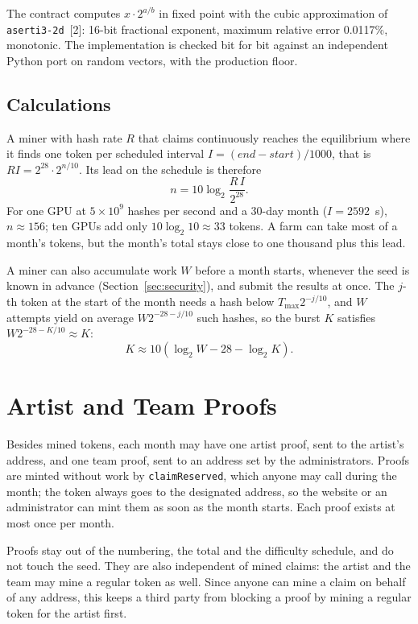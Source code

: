\documentclass[10pt,letterpaper]{article}
\newcommand{\fn}[1]{\texttt{#1}}
\begin{document}
The contract computes $x \cdot 2^{a/b}$ in fixed point with the cubic approximation of
\texttt{aserti3-2d}~[2]: 16-bit fractional exponent, maximum relative error 0.0117\%, monotonic. The
implementation is checked bit for bit against an independent Python port on random vectors, with the production
floor.

\subsection*{Calculations}

A miner with hash rate $R$ that claims continuously reaches the equilibrium where it finds one token per scheduled
interval $I = (\mathit{end} - \mathit{start})/1000$, that is $R I = 2^{28} \cdot 2^{n/10}$. Its lead on the
schedule is therefore
\[
  n = 10 \log_2 \frac{R\, I}{2^{28}} .
\]
For one GPU at $5 \times 10^9$ hashes per second and a 30-day month ($I = 2592$~s), $n \approx 156$; ten GPUs add
only $10 \log_2 10 \approx 33$ tokens. A farm can take most of a month's tokens, but the month's total stays close
to one thousand plus this lead.

A miner can also accumulate work $W$ before a month starts, whenever the seed is known in advance
(Section~\ref{sec:security}), and submit the results at once. The $j$-th token at the start of the month needs a hash
below $T_{\max} 2^{-j/10}$, and $W$ attempts yield on average $W 2^{-28-j/10}$ such hashes, so the burst $K$
satisfies $W 2^{-28-K/10} \approx K$:
\[
  K \approx 10 \left(\log_2 W - 28 - \log_2 K\right).
\]

\section{Artist and Team Proofs}\label{sec:proofs}

Besides mined tokens, each month may have one artist proof, sent to the artist's address, and one team proof, sent
to an address set by the administrators. Proofs are minted without work by \fn{claimReserved}, which anyone may
call during the month; the token always goes to the designated address, so the website or an administrator can
mint them as soon as the month starts. Each proof exists at most once per month.

Proofs stay out of the numbering, the total and the difficulty schedule, and do not touch the seed. They are also
independent of mined claims: the artist and the team may mine a regular token as well. Since anyone can mine a
claim on behalf of any address, this keeps a third party from blocking a proof by mining a regular token for the
artist first.
\end{document}
